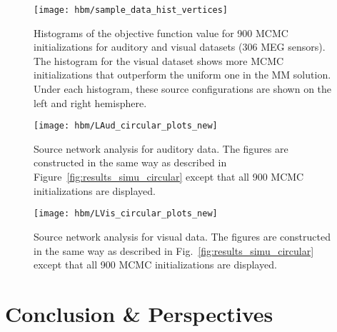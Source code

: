 \begin{figure}[htp]
	\centering
	\texttt{[image: hbm/sample\_data\_hist\_vertices]}%
	\caption{Histograms of the objective function value for 900 MCMC initializations for auditory and visual datasets (306 MEG sensors). The histogram for the visual dataset shows more MCMC initializations that outperform the uniform one in the MM solution. Under each histogram, these source configurations are shown on the left and right hemisphere.
	}
	\label{fig:hist_real_datasets}
\end{figure}



\begin{figure}[htp]
	\centering
	\texttt{[image: hbm/LAud\_circular\_plots\_new]}%
	\caption{Source network analysis for auditory data. The figures are constructed in the same way as described in Figure~\ref{fig:results_simu_circular} except that all 900 MCMC initializations are displayed.}
	\label{fig:circular_plots_LAud}
\end{figure}



\begin{figure}[htp]
	\centering
	\texttt{[image: hbm/LVis\_circular\_plots\_new]}%
	\caption{Source network analysis for visual data. The figures are constructed in the same way as described in Fig.~\ref{fig:results_simu_circular} except that all 900 MCMC initializations are displayed.}
	\label{fig:circular_plots_LVis}
\end{figure}

\section{Conclusion \& Perspectives}
\label{sec:Dis}

